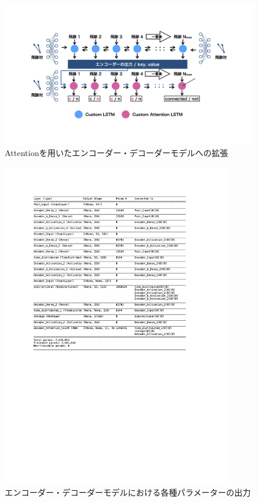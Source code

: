 \begin{figure}[h]
 \centering
 \includegraphics[trim = 0 80 0 0, width=1.0\textwidth]{Figure/3Networks/3-4-1-2EncoderDecoderVLSTM.png}
 \caption{Attentionを用いたエンコーダー・デコーダーモデルへの拡張}
 \label{3-4-1-2EncoderDecoderVLSTM}
\end{figure}

\begin{figure}[h]
 \centering
 \includegraphics[trim = 75 300 125 0, width=0.9\textwidth]{Figure/3Networks/3-4-1-3VLSTMSummary.png}
 \caption{エンコーダー・デコーダーモデルにおける各種パラメーターの出力}
 \label{3-4-1-3VLSTMSummary}
\end{figure}


